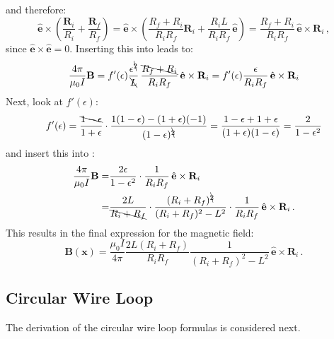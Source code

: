 and therefore:
\begin{equation}
   \hat{\mathbf{e}} \times \left( \frac{\mathbf{R}_i}{R_i} + \frac{\mathbf{R}_f}{R_f} \right)
 = \hat{\mathbf{e}} \times \left( \frac{R_f+R_i}{R_i R_f} \mathbf{R}_i + \frac{R_i L}{R_i R_f} \, \hat{\mathbf{e}} \right)
 = \frac{R_f+R_i}{R_i R_f} \, \hat{\mathbf{e}} \times \mathbf{R}_i \, ,
\end{equation}
since $\hat{\mathbf{e}} \times \hat{\mathbf{e}} = 0$.
Inserting this into  leads to:
\begin{equation}
   \frac{4 \pi}{\mu_0 I} \mathbf{B}
 = f'(\epsilon) \frac{\epsilon^{\bcancel{2}}}{\bcancel{L}} \, \frac{\bcancel{R_f+R_i}}{R_i R_f} \, \hat{\mathbf{e}} \times \mathbf{R}_i
 = f'(\epsilon) \frac{\epsilon}{R_i R_f} \, \hat{\mathbf{e}} \times \mathbf{R}_i \label{eqn:B_intermediate_2}
\end{equation}
Next, look at $f'(\epsilon)$:
\begin{equation}
   f'(\epsilon)
 = \frac{\bcancel{1 - \epsilon}}{1 + \epsilon} \cdot \frac{1 (1-\epsilon) - (1+\epsilon) (-1)}{(1 - \epsilon)^{\bcancel{2}}}
 = \frac{1 - \epsilon + 1 + \epsilon}{(1 + \epsilon)(1 - \epsilon)}
 = \frac{2}{1 - \epsilon^2}
\end{equation}
and insert this into :
\begin{align}
   \frac{4 \pi}{\mu_0 I} \mathbf{B}
 = & \frac{2 \epsilon}{1 - \epsilon^2} \cdot \frac{1}{R_i R_f} \, \hat{\mathbf{e}} \times \mathbf{R}_i \\
 = & \frac{2 L}{\bcancel{R_i + R_f}} \cdot \frac{(R_i + R_f)^{\bcancel{2}}}{(R_i + R_f)^2 - L^2} \cdot \frac{1}{R_i R_f} \, \hat{\mathbf{e}} \times \mathbf{R}_i \, .
\end{align}
This results in the final expression for the magnetic field:
\begin{equation}
 \boxed{\mathbf{B} (\mathbf{x}) = \frac{\mu_0 I}{4 \pi} \frac{2 L (R_i + R_f)}{R_i R_f} \frac{1}{(R_i + R_f)^2 - L^2} \, \hat{\mathbf{e}} \times \mathbf{R}_i } \, .
\end{equation}

\subsection{Circular Wire Loop}
The derivation of the circular wire loop formulas is considered next.

